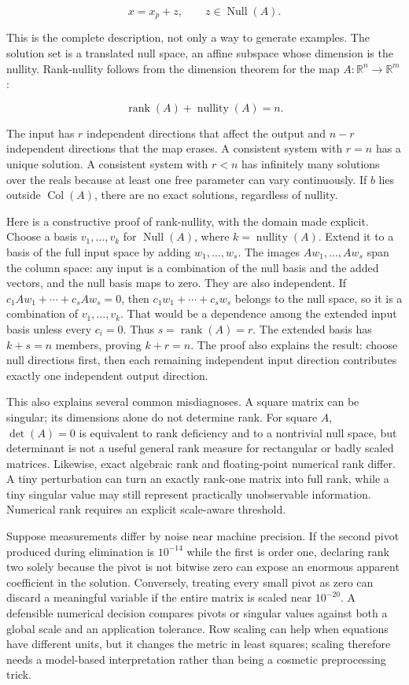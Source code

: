 \[
x=x_p+z,\qquad z\in\operatorname{Null}(A).
\]

This is the complete description, not only a way to generate examples. The solution set is a translated null space, an affine subspace whose dimension is the nullity. Rank-nullity follows from the dimension theorem for the map \(A:\mathbb R^n\to\mathbb R^m\):

\[
\operatorname{rank}(A)+\operatorname{nullity}(A)=n.
\]

The input has \(r\) independent directions that affect the output and \(n-r\) independent directions that the map erases. A consistent system with \(r=n\) has a unique solution. A consistent system with \(r<n\) has infinitely many solutions over the reals because at least one free parameter can vary continuously. If \(b\) lies outside \(\operatorname{Col}(A)\), there are no exact solutions, regardless of nullity.

Here is a constructive proof of rank-nullity, with the domain made explicit. Choose a basis \(v_1,\ldots,v_k\) for \(\operatorname{Null}(A)\), where \(k=\operatorname{nullity}(A)\). Extend it to a basis of the full input space by adding \(w_1,\ldots,w_s\). The images \(Aw_1,\ldots,Aw_s\) span the column space: any input is a combination of the null basis and the added vectors, and the null basis maps to zero. They are also independent. If \(c_1Aw_1+\cdots+c_sAw_s=0\), then \(c_1w_1+\cdots+c_sw_s\) belongs to the null space, so it is a combination of \(v_1,\ldots,v_k\). That would be a dependence among the extended input basis unless every \(c_i=0\). Thus \(s=\operatorname{rank}(A)=r\). The extended basis has \(k+s=n\) members, proving \(k+r=n\). The proof also explains the result: choose null directions first, then each remaining independent input direction contributes exactly one independent output direction.

This also explains several common misdiagnoses. A square matrix can be singular; its dimensions alone do not determine rank. For square \(A\), \(\det(A)=0\) is equivalent to rank deficiency and to a nontrivial null space, but determinant is not a useful general rank measure for rectangular or badly scaled matrices. Likewise, exact algebraic rank and floating-point numerical rank differ. A tiny perturbation can turn an exactly rank-one matrix into full rank, while a tiny singular value may still represent practically unobservable information. Numerical rank requires an explicit scale-aware threshold.

Suppose measurements differ by noise near machine precision. If the second pivot produced during elimination is \(10^{-14}\) while the first is order one, declaring rank two solely because the pivot is not bitwise zero can expose an enormous apparent coefficient in the solution. Conversely, treating every small pivot as zero can discard a meaningful variable if the entire matrix is scaled near \(10^{-20}\). A defensible numerical decision compares pivots or singular values against both a global scale and an application tolerance. Row scaling can help when equations have different units, but it changes the metric in least squares; scaling therefore needs a model-based interpretation rather than being a cosmetic preprocessing trick.

